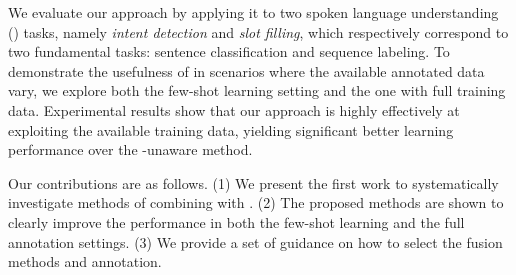 %
We evaluate our approach by applying it to two spoken language understanding (\SLU) tasks, namely \emph{intent detection} and \emph{slot
filling}, which respectively correspond to two fundamental \NLP tasks: sentence classification and sequence labeling. To demonstrate the
usefulness of \REs in scenarios where the available annotated data vary, we explore both the few-shot learning setting and the one with
full training data. Experimental results show that our approach is highly effectively at exploiting the available training data, yielding
significant better learning performance over the \RE-unaware method.




Our contributions are as follows. (1) We present the first work to systematically investigate methods of combining \REs with \NNs. (2) The
proposed methods are shown to clearly improve the \NN performance in both the few-shot learning and the full annotation settings. (3) We
provide a set of guidance on how to select the fusion methods and \RE annotation.
